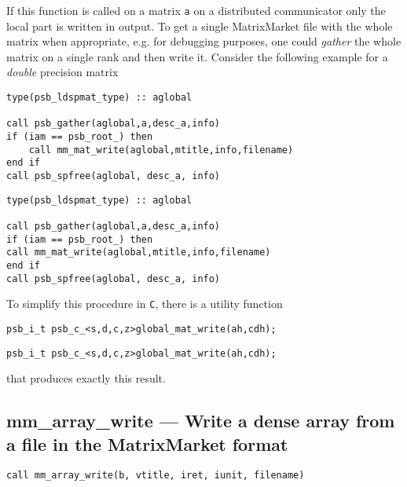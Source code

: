 If this function is called on a matrix \lstinline|a| on a distributed communicator
only the local part is written in output. To get a single MatrixMarket file with
the whole matrix when appropriate, e.g. for debugging purposes, one could \emph{gather} 
the  whole matrix on a single rank and then write it. Consider the following example
for a \emph{double} precision matrix\vspace{-0.5em}
\ifpdf
\begin{verbatim}
type(psb_ldspmat_type) :: aglobal

call psb_gather(aglobal,a,desc_a,info)
if (iam == psb_root_) then
	call mm_mat_write(aglobal,mtitle,info,filename)
end if
call psb_spfree(aglobal, desc_a, info)
\end{verbatim}
\else
\begin{center}
\begin{minipage}[tl]{0.9\textwidth}
\begin{verbatim} 
type(psb_ldspmat_type) :: aglobal

call psb_gather(aglobal,a,desc_a,info)
if (iam == psb_root_) then
call mm_mat_write(aglobal,mtitle,info,filename)
end if
call psb_spfree(aglobal, desc_a, info)
\end{verbatim}
\end{minipage}
\end{center}
\fi
To simplify this procedure in \verb|C|, there is a utility function\vspace{-0.5em}
\ifpdf
\begin{verbatim}
psb_i_t psb_c_<s,d,c,z>global_mat_write(ah,cdh);
\end{verbatim}
\else
\begin{center}
\begin{minipage}[tl]{0.9\textwidth}
\begin{verbatim}
psb_i_t psb_c_<s,d,c,z>global_mat_write(ah,cdh);
\end{verbatim}
\end{minipage}
\end{center}
\fi 
that produces exactly this result.


\clearpage\subsection{mm\_array\_write ---  Write a dense array from a
  file in the MatrixMarket format}

\begin{lstlisting}
call mm_array_write(b, vtitle, iret, iunit, filename)
\end{lstlisting}

